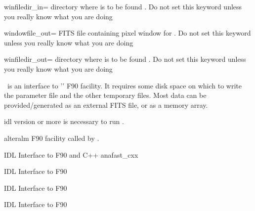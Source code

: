 \begin{keywords}
\begin{kwlist}{}
  \item[winfiledir\_in=] %
     directory where  is to be found 
        .
      Do not set this keyword unless you really know what you are doing

 \item[windowfile\_out=]  %
    FITS file containing pixel window for 
        .
      Do not set this keyword unless you really know what you are doing

  \item[winfiledir\_out=] %
     directory where  is to be found 
        .
      Do not set this keyword unless you really know what you are doing

  \end{kwlist}
\end{keywords}  

\begin{codedescription}
{\thedocid\ is an interface to '' F90 facility. It
requires some disk space on which to write the parameter file and the other
temporary files. Most data can be provided/generated as an external FITS
file, or as a memory array.}
\end{codedescription}



\begin{related}
  \begin{sulist}{} %
    \item[idl] version \idlversion or more is necessary to run \thedocid.
    \item[alteralm] F90 facility called by \thedocid.
    \item[\htmlref{ianafast}{idl:ianafast}] IDL Interface to F90  and C++ anafast\_cxx
    \item[\htmlref{iprocess\_mask}{idl:iprocess_mask}] IDL Interface to F90 
    \item[\htmlref{ismoothing}{idl:ismoothing}] IDL Interface to F90 
    \item[\htmlref{isynfast}{idl:isynfast}] IDL Interface to F90 
  \end{sulist}
\end{related}

